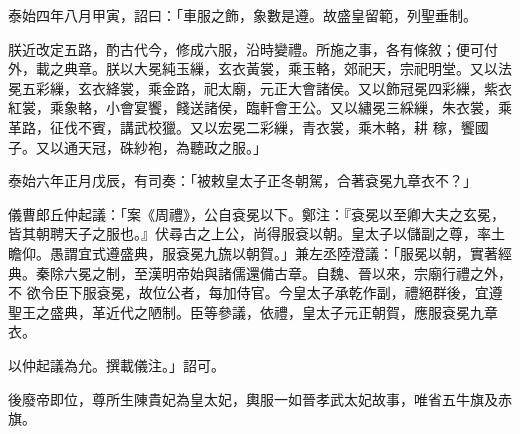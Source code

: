 \begin{pinyinscope}
 泰始四年八月甲寅，詔曰：「車服之飾，象數是遵。故盛皇留範，列聖垂制。



 朕近改定五路，酌古代今，修成六服，沿時變禮。所施之事，各有條敘；便可付外，載之典章。朕以大冕純玉繅，玄衣黃裳，乘玉輅，郊祀天，宗祀明堂。又以法冕五彩繅，玄衣絳裳，乘金路，祀太廟，元正大會諸侯。又以飾冠冕四彩繅，紫衣紅裳，乘象輅，小會宴饗，餞送諸侯，臨軒會王公。又以繡冕三綵繅，朱衣裳，乘革路，征伐不賓，講武校獵。又以宏冕二彩繅，青衣裳，乘木輅，耕
 稼，饗國子。又以通天冠，硃紗袍，為聽政之服。」



 泰始六年正月戊辰，有司奏：「被敕皇太子正冬朝駕，合著袞冕九章衣不？」



 儀曹郎丘仲起議：「案《周禮》，公自袞冕以下。鄭注：『袞冕以至卿大夫之玄冕，皆其朝聘天子之服也。』伏尋古之上公，尚得服袞以朝。皇太子以儲副之尊，率土瞻仰。愚謂宜式遵盛典，服袞冕九旒以朝賀。」兼左丞陸澄議：「服冕以朝，實著經典。秦除六冕之制，至漢明帝始與諸儒還備古章。自魏、晉以來，宗廟行禮之外，不
 欲令臣下服袞冕，故位公者，每加侍官。今皇太子承乾作副，禮絕群後，宜遵聖王之盛典，革近代之陋制。臣等參議，依禮，皇太子元正朝賀，應服袞冕九章衣。



 以仲起議為允。撰載儀注。」詔可。



 後廢帝即位，尊所生陳貴妃為皇太妃，輿服一如晉孝武太妃故事，唯省五牛旗及赤旗。



\end{pinyinscope}